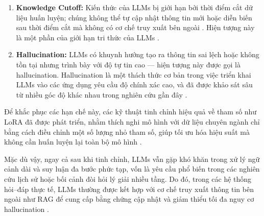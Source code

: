 \begin{enumerate}
    \item \textbf{Knowledge Cutoff:} Kiến thức của LLMs bị giới hạn bởi thời điểm cắt dữ liệu huấn luyện; chúng không thể tự cập nhật thông tin mới hoặc diễn biến sau thời điểm cắt mà không có cơ chế truy xuất bên ngoài \cite{li2025knowledge}. Hiện tượng này là một phần của giới hạn tri thức của LLMs \cite{li2025knowledge}.
    
    \item \textbf{Hallucination:} LLMs có khuynh hướng tạo ra thông tin sai lệch hoặc không tồn tại nhưng trình bày với độ tự tin cao — hiện tượng này được gọi là hallucination. Hallucination là một thách thức cơ bản trong việc triển khai LLMs vào các ứng dụng yêu cầu độ chính xác cao, và đã được khảo sát sâu từ nhiều góc độ khác nhau trong nghiên cứu gần đây \cite{tonmoy2024comprehensive, andriopoulos2023augmenting}. 
\end{enumerate}

Để khắc phục các hạn chế này, các kỹ thuật tinh chỉnh hiệu quả về tham số như LoRA đã được phát triển, nhằm thích nghi mô hình với dữ liệu chuyên ngành chỉ bằng cách điều chỉnh một số lượng nhỏ tham số, giúp tối ưu hóa hiệu suất mà không cần huấn luyện lại toàn bộ mô hình \cite{gao2023retrieval}.  

Mặc dù vậy, ngay cả sau khi tinh chỉnh, LLMs vẫn gặp khó khăn trong xử lý ngữ cảnh dài và suy luận đa bước phức tạp, vốn là yêu cầu phổ biến trong các nghiên cứu lịch sử hoặc bối cảnh đòi hỏi lý giải nhiều tầng. Do đó, trong các hệ thống hỏi–đáp thực tế, LLMs thường được kết hợp với cơ chế truy xuất thông tin bên ngoài như RAG để cung cấp bằng chứng cập nhật và giảm thiểu tối đa nguy cơ hallucination \cite{lewis2020rag}.